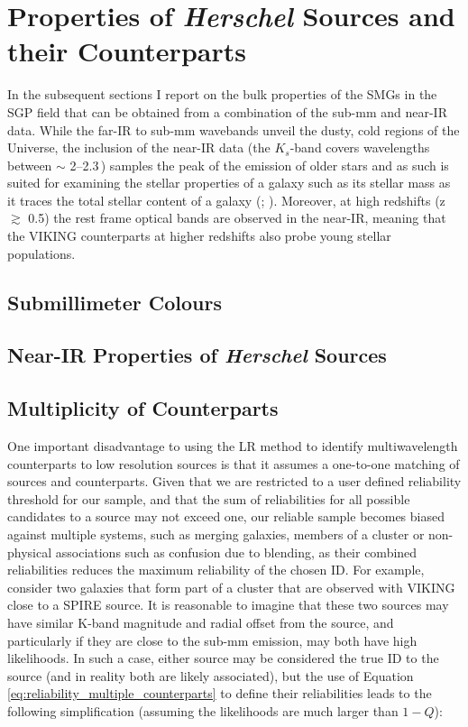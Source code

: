 \section{Properties of \textit{Herschel} Sources and their Counterparts}

In the subsequent sections I report on the bulk properties of the SMGs in the SGP field that can be obtained from a combination of the sub-mm and near-IR data. While the far-IR to sub-mm wavebands unveil the dusty, cold regions of the Universe, the inclusion of the near-IR data (the $K_s$-band covers wavelengths between $\sim$ 2--2.3\,\micron) samples the peak of the emission of older stars and as such is suited for examining the stellar properties of a galaxy such as its stellar mass as it traces the total stellar content of a galaxy (\citealt{Cole_2001}; \citealt{Bell_2003}). Moreover, at high redshifts (z $\gtrsim$ 0.5) the rest frame optical bands are observed in the near-IR, meaning that the VIKING counterparts at higher redshifts also probe young stellar populations.

\subsection{Submillimeter Colours}
\subsection{Near-IR Properties of \textit{Herschel} Sources}

\subsection{Multiplicity of Counterparts}
One important disadvantage to using the LR method to identify multiwavelength counterparts to low resolution sources is that it assumes a one-to-one matching of sources and counterparts. Given that we are restricted to a user defined reliability threshold for our sample, and that the sum of reliabilities for all possible candidates to a source may not exceed one, our reliable sample becomes biased against multiple systems, such as merging galaxies, members of a cluster or non-physical associations such as confusion due to blending, as their combined reliabilities reduces the maximum reliability of the chosen ID. For example, consider two galaxies that form part of a cluster that are observed with VIKING close to a SPIRE source. It is reasonable to imagine that these two sources may have similar K-band magnitude and radial offset from the source, and particularly if they are close to the sub-mm emission, may both have high likelihoods. In such a case, either source may be considered the true ID to the source (and in reality both are likely associated), but the use of Equation \ref{eq:reliability_multiple_counterparts} to define their reliabilities leads to the following simplification (assuming the likelihoods are much larger than $1-Q$):

